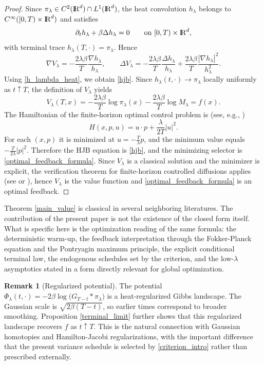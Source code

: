 \documentclass[11pt]{amsart}
\def\R{\mathrm{I\kern-0.21emR}}
\renewcommand{\Vert}{|}
\numberwithin{equation}{section}
\numberwithin{figure}{section}
\theoremstyle{definition}\newtheorem{remark}[theorem]{Remark}%
\begin{document}
\begin{proof}
Since $\pi_\lambda \in C^2(\R^d) \cap L^1(\R^d)$, the heat convolution $h_\lambda$ belongs to $C^\infty([0,T) \times \R^d)$ and satisfies
\begin{equation}\label{h_lambda_heat}
\partial_t h_\lambda + \beta \Delta h_\lambda = 0
\qquad
\text{on } [0,T) \times \R^d,
\end{equation}
with terminal trace $h_\lambda(T,\cdot) = \pi_\lambda$. Hence
$$
\nabla V_\lambda = - \frac{2\lambda\beta}{T}\frac{\nabla h_\lambda}{h_\lambda},
\qquad
\Delta V_\lambda = - \frac{2\lambda\beta}{T}\frac{\Delta h_\lambda}{h_\lambda} + \frac{2\lambda\beta}{T}\frac{\Vert \nabla h_\lambda \Vert^2}{h_\lambda^2}.
$$
Using \eqref{h_lambda_heat}, we obtain \eqref{hjb}. Since $h_\lambda(t,\cdot) \to \pi_\lambda$ locally uniformly as $t \uparrow T$, the definition of $V_\lambda$ yields
$$
V_\lambda(T,x) = - \frac{2\lambda\beta}{T}\log \pi_\lambda(x) - \frac{2\lambda\beta}{T}\log M_\lambda = f(x).
$$
The Hamiltonian of the finite-horizon optimal control problem is (see, e.g., \cite{PontryaginBook, TrelatBook, YongZhou99})
$$
H(x,p,u) = u \cdot p+ \frac{\lambda}{2T}\Vert u \Vert^2 .
$$
For each $(x,p)$ it is minimized at $u = - \frac{T}{\lambda}p$, and the minimum value equals $- \frac{T}{2\lambda}\Vert p \Vert^2$. Therefore the HJB equation is \eqref{hjb}, and the minimizing selector is \eqref{optimal_feedback_formula}. Since $V_\lambda$ is a classical solution and the minimizer is explicit, the verification theorem for finite-horizon controlled diffusions applies (see \cite[Chapter IV]{FlemingSoner06} or \cite[Chapter 4]{YongZhou99}), hence $V_\lambda$ is the value function and \eqref{optimal_feedback_formula} is an optimal feedback.
\end{proof}

Theorem \ref{main_value} is classical in several neighboring literatures. The contribution of the present paper is not the existence of the closed form itself. What is specific here is the optimization reading of the same formula: the deterministic warm-up, the feedback interpretation through the Fokker-Planck equation and the Pontryagin maximum principle, the explicit conditional terminal law, the endogenous schedules set by the criterion, and the low-$\lambda$ asymptotics stated in a form directly relevant for global optimization.

\begin{remark}[Regularized potential]\label{regularized_potential}
The potential $\Phi_\lambda(t,\cdot) = - 2\beta \log \big( G_{T-t} * \pi_\lambda \big)$ is a heat-regularized Gibbs landscape. The Gaussian scale is $\sqrt{2\beta(T-t)}$, so earlier times correspond to broader smoothing. Proposition \ref{terminal_limit} further shows that this regularized landscape recovers $f$ as $t \uparrow T$. This is the natural connection with Gaussian homotopies and Hamilton-Jacobi regularizations, with the important difference that the present variance schedule is selected by \eqref{criterion_intro} rather than prescribed externally.
\end{remark}
\end{document}
